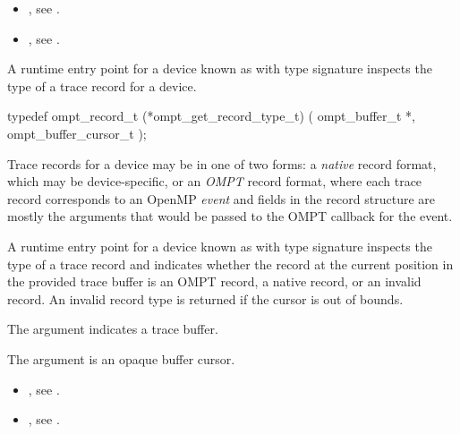 \crossreferences
\begin{itemize}
\item {},
see .
\item {},
see .
\end{itemize}

\label{sec:ompt_get_record_type_t}

\summary
A runtime entry point for a device known as
 with type signature
 inspects the type
of a trace record for a device.

\format
\begin{ccppspecific}
\begin{omptInquiry}
typedef ompt_record_t (*ompt_get_record_type_t) (
  ompt_buffer_t *,
  ompt_buffer_cursor_t 
);
\end{omptInquiry}
\end{ccppspecific}

\descr

Trace records for a device may be in one of two forms: a
\emph{native} record format, which may be device-specific,
or an \emph{OMPT} record format, where each trace record
corresponds to an OpenMP \emph{event} and fields in the record
structure are mostly the arguments that would be passed to the
OMPT callback for the event.

A runtime entry point for a device known as
 with type signature
 inspects the type
of a trace record and indicates whether the record at the current
position in the provided trace buffer is an OMPT record,
a native record, or an invalid record. An invalid record type
is returned if the cursor is out of bounds.

\argdesc
The argument  indicates a trace buffer.

The argument  is an opaque buffer cursor.




\crossreferences
\begin{itemize}
\item {},
see .
\item {},
see .
\end{itemize}

\label{sec:ompt_get_record_ompt_t}


